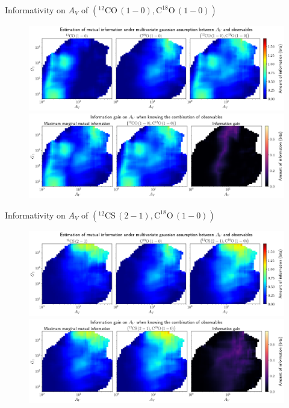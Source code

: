 \documentclass{beamer}
\begin{document}
\begin{frame}{Informativity on $A_V$ of $\left(\mathrm{^{12}CO\,(1-0)},\mathrm{C^{18}O\,(1-0)}\right)$}
    \begin{figure}
        \centering
        \includegraphics[width=0.95\linewidth]{../linearinfogauss/av__12co10_c18o10_linearinfogauss.png}
        \vfill
        \includegraphics[width=0.95\linewidth]{../linearinfogauss/av__12co10_c18o10_linearinfogauss_gain.png}
    \end{figure}
\end{frame}

\begin{frame}{Informativity on $A_V$ of $\left(\mathrm{^{12}CS\,(2-1)},\mathrm{C^{18}O\,(1-0)}\right)$}
    \begin{figure}
        \centering
        \includegraphics[width=0.95\linewidth]{../linearinfogauss/av__12cs21_c18o10_linearinfogauss.png}
        \vfill
        \includegraphics[width=0.95\linewidth]{../linearinfogauss/av__12cs21_c18o10_linearinfogauss_gain.png}
    \end{figure}
\end{frame}
\end{document}

